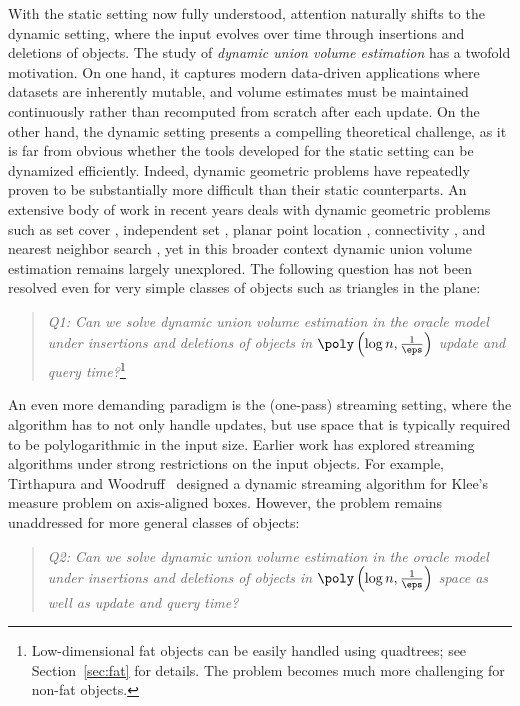 %
With the static setting now fully understood, attention naturally shifts to the dynamic setting, where the input evolves over time through insertions and deletions of objects. The study of \emph{dynamic union volume estimation} has a twofold motivation. On one hand, it captures modern data-driven applications where datasets are inherently mutable, and volume estimates must be maintained continuously rather than recomputed from scratch after each update. On the other hand, the dynamic setting presents a compelling theoretical challenge, as it is far from obvious whether the tools developed for the static setting can be dynamized efficiently.
Indeed, dynamic geometric problems have repeatedly proven to be substantially more difficult than their static counterparts. An extensive body of work in recent years deals with dynamic geometric problems such as set cover \cite{AgarwalCSXX22, ChanHSX25}, independent set \cite{Henzinger0W20, BhoreNTW24, BhoreC25}, planar point location \cite{Nekrich21}, connectivity \cite{ChanPR11, ChanH24a}, and nearest neighbor search \cite{AgarwalAS18}, yet in this broader context dynamic union volume estimation remains largely unexplored. The following question has not been resolved even for very simple classes of objects such as triangles in the plane:
%
\begin{quote}
\begin{center}
   \emph{Q1: Can we solve dynamic union volume estimation in the oracle model under insertions and deletions of objects in $\poly \left( \log n, \frac{1}{\eps} \right)$ update and query time?}\footnote{Low-dimensional fat objects can be easily handled using quadtrees; see Section~\ref{sec:fat} for details. The problem becomes much more challenging for non-fat objects.}
\end{center}
\end{quote}
%
An even more demanding paradigm is the (one-pass) streaming setting, where the algorithm has to not only handle updates, but use space that is typically required to be polylogarithmic in the input size. Earlier work has explored streaming algorithms under strong restrictions on the input objects. For example, Tirthapura and Woodruff~\cite{TW12} designed a dynamic streaming algorithm for Klee’s measure problem on axis-aligned boxes. However, the problem remains unaddressed for more general classes of objects:
%
\begin{quote}
\begin{center}
   \emph{Q2: Can we solve dynamic union volume estimation in the oracle model under insertions and deletions of objects in $\poly \left( \log n, \frac{1}{\eps} \right)$ space as well as update and query time?}
\end{center}
\end{quote}
